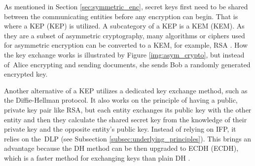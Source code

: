 As mentioned in Section \ref{sec:symmetric_enc}, secret keys first need to be shared between the communicating entities before any encryption can begin. That is where a KEP (\acl{KEP}) is utilized. A subcategory of a KEP is a KEM (\acl{KEM}). As they are a subset of asymmetric cryptography, many algorithms or ciphers used for asymmetric encryption can be converted to a KEM, for example, RSA \cite{Ristic2014}. How the key exchange works is illustrated by Figure \ref{img:asym_crypto}, but instead of~Alice encrypting and sending documents, she sends Bob a randomly generated encrypted key.

Another alternative of a KEP utilizes a dedicated key exchange method, such as the Diffie-Hellman protocol. It also works on the principle of having a public, private key pair like RSA, but each entity exchanges its public key with the other entity and then they calculate the shared secret key from the knowledge of their private key and the opposite entity's public key. Instead of relying on IFP, it relies on the~DLP (see Subsection \ref{subsec:underlying_principles}). This brings an advantage because the DH method can be then upgraded to \acl{ECDH} (ECDH), which is a faster method for exchanging keys than plain DH \cite{Ristic2014}.
